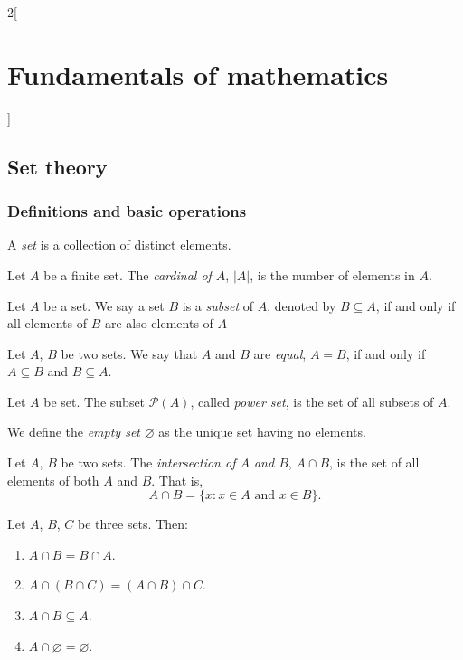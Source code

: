 \documentclass[../../../main.tex]{subfiles}
\begin{document}
\begin{multicols}{2}[\section{Fundamentals of mathematics}]
    \subsection{Set theory}
    \subsubsection*{Definitions and basic operations}
    \begin{definition}
        A \textit{set} is a collection of distinct elements.
    \end{definition}
    \begin{definition}
        Let $A$ be a finite set. The \textit{cardinal of $A$}, $|A|$, is the number of elements in $A$.
    \end{definition}
    \begin{definition}
        Let $A$ be a set. We say a set $B$ is a \textit{subset} of $A$, denoted by $B\subseteq A$, if and only if all elements of $B$ are also elements of $A$
    \end{definition}
    \begin{definition}
        Let $A$, $B$ be two sets. We say that $A$ and $B$ are \textit{equal}, $A=B$, if and only if $A\subseteq B$ and $B\subseteq A$.
    \end{definition}
    \begin{definition}
        Let $A$ be set. The subset $\mathcal{P}(A)$, called \textit{power set}, is the set of all subsets of $A$.
    \end{definition}
    \begin{definition}
        We define the \textit{empty set} $\varnothing$ as the unique set having no elements.
    \end{definition}
    \begin{definition}
        Let $A$, $B$ be two sets. The \textit{intersection of $A$ and $B$}, $A\cap B$, is the set of all elements of both $A$ and $B$. That is, $$A\cap B=\{x:x\in A\text{ and }x\in B\}.$$
    \end{definition}
    \begin{prop}
        Let $A$, $B$, $C$ be three sets. Then:
        \begin{enumerate}
            \item $A\cap B=B\cap A$.
            \item $A\cap(B\cap C)=(A\cap B)\cap C$.
            \item $A\cap B\subseteq A$.
            \item $A\cap\varnothing=\varnothing$.

\end{enumerate}
\end{prop}
\end{multicols}
\end{document}
